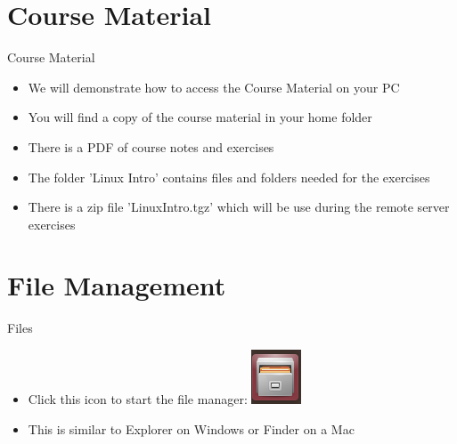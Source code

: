 \section{Course Material}
\begin{frame}{Course Material}
\begin{itemize}
\item We will demonstrate how to access the Course Material on your PC
\item You will find a copy of the course material in your home folder
\item There is a PDF of course notes and exercises
\item The folder 'Linux Intro' contains files and folders needed for the exercises
\item There is a zip file 'LinuxIntro.tgz' which will be use during the remote server exercises 
\end{itemize}
\end{frame}

\section{File Management}
\begin{frame}{Files}
\begin{itemize}
\item Click this icon to start the file manager:
\includegraphics{imgs/files.png}
\item This is similar to Explorer on Windows or Finder on a Mac
\end{itemize}
\end{frame}

